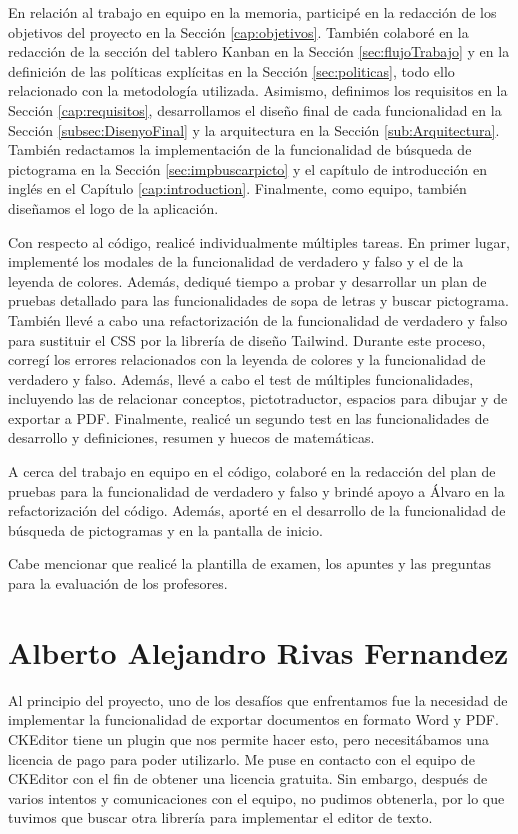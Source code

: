 En relación al trabajo en equipo en la memoria, participé en la redacción de los objetivos del proyecto en la Sección \ref{cap:objetivos}. También colaboré en la redacción de la sección del tablero Kanban en la Sección \ref{sec:flujoTrabajo} y en la definición de las políticas explícitas en la Sección \ref{sec:politicas}, todo ello relacionado con la metodología utilizada. Asimismo, definimos los requisitos en la Sección \ref{cap:requisitos}, desarrollamos el diseño final de cada funcionalidad en la Sección \ref{subsec:DisenyoFinal} y la arquitectura en la Sección \ref{sub:Arquitectura}. También redactamos la implementación de la funcionalidad de búsqueda de pictograma en la Sección \ref{sec:impbuscarpicto} y el capítulo de introducción en inglés en el Capítulo \ref{cap:introduction}. Finalmente, como equipo, también diseñamos el logo de la aplicación.

Con respecto al código, realicé individualmente múltiples tareas. En primer lugar, implementé los modales de la funcionalidad de verdadero y falso y el de la leyenda de colores. Además, dediqué tiempo a probar y desarrollar un plan de pruebas detallado para las funcionalidades de sopa de letras y buscar pictograma. También llevé a cabo una refactorización de la funcionalidad de verdadero y falso para sustituir el CSS por la librería de diseño Tailwind. Durante este proceso, corregí los errores relacionados con la leyenda de colores y la funcionalidad de verdadero y falso. Además, llevé a cabo el test de múltiples funcionalidades, incluyendo las de relacionar conceptos, pictotraductor, espacios para dibujar y de exportar a PDF. Finalmente, realicé un segundo test en las funcionalidades de desarrollo y definiciones, resumen y huecos de matemáticas. 

A cerca del trabajo en equipo en el código, colaboré en la redacción del plan de pruebas para la funcionalidad de verdadero y falso y brindé apoyo a Álvaro en la refactorización del código. Además, aporté en el desarrollo de la funcionalidad de búsqueda de pictogramas y en la pantalla de inicio.

Cabe mencionar que realicé la plantilla de examen, los apuntes y las preguntas para la evaluación de los profesores.

\section{Alberto Alejandro Rivas Fernandez}
Al principio del proyecto, uno de los desafíos que enfrentamos fue la necesidad de implementar la funcionalidad de exportar documentos en formato Word y PDF. CKEditor tiene un plugin que nos permite hacer esto, pero necesitábamos una licencia de pago para poder utilizarlo. Me puse en contacto con el equipo de CKEditor con el fin de obtener una licencia gratuita. Sin embargo, después de varios intentos y comunicaciones con el equipo, no pudimos obtenerla, por lo que tuvimos que buscar otra librería para implementar el editor de texto.

